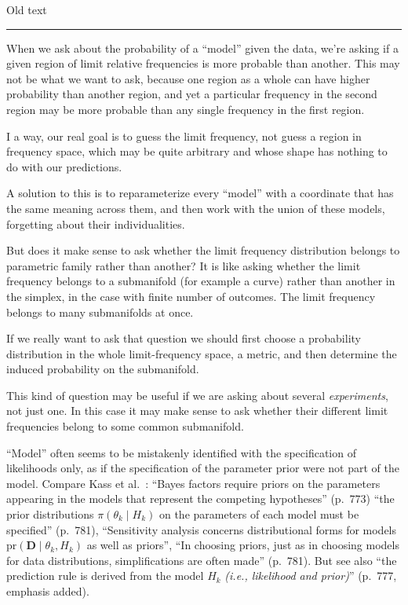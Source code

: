 \documentclass[\ifafour a4paper,12pt,\else a5paper,10pt,\fi%
onecolumn,oneside,article,%
british%
]{memoir}
\theoremstyle{remark}
\theoremstyle{innote}
\newcommand*{\citey}{\parencites*}
\renewcommand*{\|}{\mathpunct{|}}
\newcommand*{\etal}{{et al.}}
\begin{document}
\clearpage
Old text\\
\hrule

When we ask about the probability of a \enquote{model} given the data,
we're asking if a given region of limit relative frequencies is more
probable than another. This may not be what we want to ask, because one
region as a whole can have higher probability than another region, and yet
a particular frequency in the second region may be more probable than any single
frequency in the first region.

I a way, our real goal is to guess the limit frequency, not guess a region
in frequency space, which may be quite arbitrary and whose shape has
nothing to do with our predictions.

A solution to this is to reparameterize every \enquote{model} with a
coordinate that has the same meaning across them, and then work with the
union of these models, forgetting about their individualities.


But does it make sense to ask whether the limit frequency distribution
belongs to parametric family rather than another? It is like asking whether
the limit frequency belongs to a submanifold (for example a curve) rather
than another in the simplex, in the case with finite number of outcomes.
The limit frequency belongs to many submanifolds at once.

If we really want to ask that question we should first choose a probability
distribution in the whole limit-frequency space, a metric, and then
determine the induced probability on the submanifold.

This kind of question may be useful if we are asking about several
\emph{experiments}, not just one. In this case it may make sense to ask
whether their different limit frequencies belong to some common submanifold.



\enquote{Model} often seems to be mistakenly identified with the
specification of likelihoods only, as if the specification of the parameter
prior were not part of the model. Compare Kass \etal\ \citey{kassetal1995}:
\enquote{Bayes factors require priors on the parameters appearing in the
  models that represent the competing hypotheses} (p.~773) \enquote{the
  prior distributions $\pi(\theta_k \| H_k)$ on the parameters of each
  model must be specified} (p.~781), \enquote{Sensitivity analysis concerns
  distributional forms for models
  $\mathrm{pr}(\mathbf{D} \| \theta_k, H_k)$ as well as priors},
\enquote{In choosing priors, just as in choosing models for data
  distributions, simplifications are often made} (p.~781). But see also
\enquote{the prediction rule is derived from the model $H_k$ \emph{(i.e.,
    likelihood and prior)}} (p.~777, emphasis added).
\end{document}
